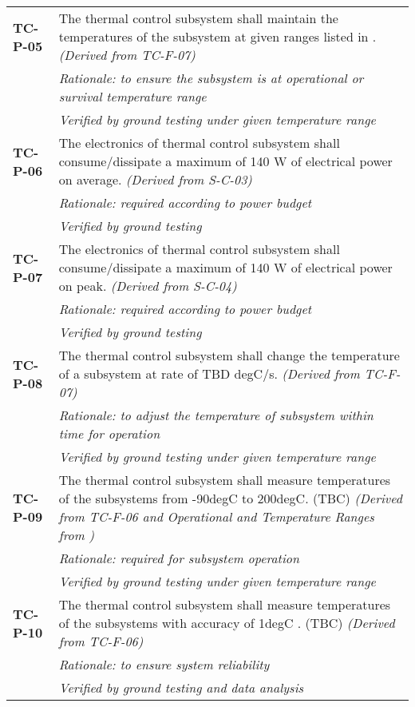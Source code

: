 \begin{longtable}{P{2cm}P{13.25cm}}
\textbf{TC-P-05}	& The thermal control subsystem shall maintain the temperatures of the subsystem at given ranges listed in .
\textit{(Derived from TC-F-07)} \\
 & \textit{Rationale: to ensure the subsystem is at operational or survival temperature range} \\
 & \textit{Verified by ground testing under given temperature range}\\
 
\textbf{TC-P-06}	& The electronics of thermal control subsystem shall consume/dissipate a maximum of 140 \gls{W} of electrical power on average. 
\textit{(Derived from S-C-03)} \\
& \textit{Rationale: required according to power budget} \\
& \textit{Verified by ground testing}	\\

\textbf{TC-P-07}	& The electronics of thermal control subsystem shall consume/dissipate a maximum of 140 \gls{W} of electrical power on peak.
\textit{(Derived from S-C-04)} \\
& \textit{Rationale: required according to power budget} \\
&  \textit{Verified by ground testing}	\\

\textbf{TC-P-08}	& The thermal control subsystem shall change the temperature of a subsystem at rate of \gls{TBD} \gls{degC/s}. \textit{(Derived from TC-F-07)} \\
 & \textit{Rationale: to adjust the temperature of subsystem within time for operation} \\
 & \textit{Verified by ground testing under given temperature range}\\

\textbf{TC-P-09}	& The thermal control subsystem shall measure temperatures of the subsystems from -90\gls{degC} to 200\gls{degC}. (\gls{TBC}) \textit{(Derived from TC-F-06 and Operational and Temperature Ranges from )} \\
 & \textit{Rationale: required for subsystem operation} \\
 &  \textit{Verified by ground testing under given temperature range}	\\

\textbf{TC-P-10}	& The thermal control subsystem shall measure temperatures of the subsystems with accuracy of 1\gls{degC} \cite{temp_sensors}. (\gls{TBC}) \textit{(Derived from TC-F-06)} \\
 & \textit{Rationale: to ensure system reliability} \\
  &  \textit{Verified by ground testing and data analysis}	\\


\end{longtable}
